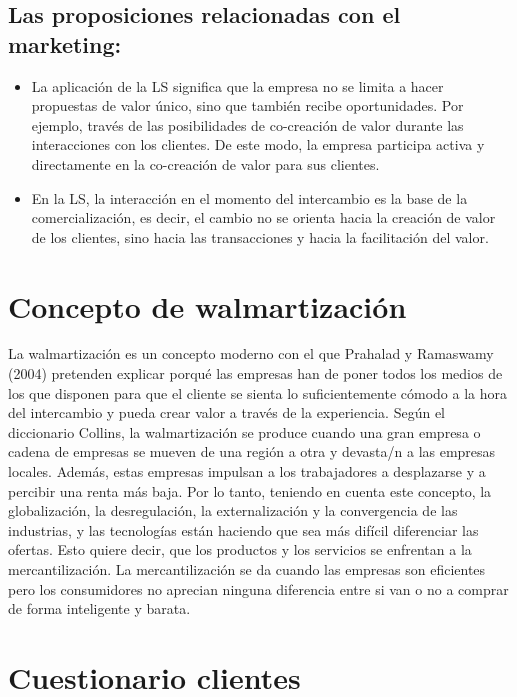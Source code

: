 \section{Las proposiciones relacionadas con el marketing:}

\begin{itemize}
	\item La aplicación de la LS significa que la empresa no se limita a hacer propuestas de valor único, sino que también recibe oportunidades. Por ejemplo, través de las posibilidades de co-creación de valor durante las interacciones con los clientes. De este modo, la empresa participa activa y directamente en la co-creación de valor para sus clientes.
	\item En la LS, la interacción en el momento del intercambio es la base de la comercialización, es decir, el cambio no se orienta hacia la creación de valor de los clientes, sino hacia las transacciones y hacia la facilitación del valor.

\end{itemize}

\chapter{Concepto de walmartización}
\label{anexo:6}

La walmartización es un concepto moderno con el que Prahalad y Ramaswamy (2004) pretenden explicar porqué las empresas han de poner todos los medios de los que disponen para que el cliente se sienta lo suficientemente cómodo a la hora del intercambio y pueda crear valor a través de la experiencia. Según el diccionario Collins, la walmartización se produce cuando una gran empresa o cadena de empresas se mueven de una región a otra y devasta/n a las empresas locales. Además, estas empresas impulsan a los trabajadores a desplazarse y a percibir una renta más baja. Por lo tanto, teniendo en cuenta este concepto, la globalización, la desregulación, la externalización y la convergencia de las industrias, y las tecnologías están haciendo que sea más difícil diferenciar las ofertas. Esto quiere decir, que los productos y los servicios se enfrentan a la mercantilización. La mercantilización se da cuando las empresas son eficientes pero los consumidores no aprecian ninguna diferencia entre si van o no a comprar de forma inteligente y barata.

\chapter{Cuestionario clientes}
\label{anexo:7}

